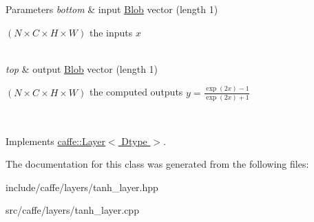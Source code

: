 \begin{DoxyParams}{Parameters}
{\em bottom} & input \hyperlink{classcaffe_1_1Blob}{Blob} vector (length 1)
\begin{DoxyEnumerate}
\item $ (N \times C \times H \times W) $ the inputs $ x $ 
\end{DoxyEnumerate}\\
\hline
{\em top} & output \hyperlink{classcaffe_1_1Blob}{Blob} vector (length 1)
\begin{DoxyEnumerate}
\item $ (N \times C \times H \times W) $ the computed outputs $ y = \frac{\exp(2x) - 1}{\exp(2x) + 1} $ 
\end{DoxyEnumerate}\\
\hline
\end{DoxyParams}


Implements \hyperlink{classcaffe_1_1Layer_add965883f75bbf90c7a06f960cda7a1a}{caffe\+::\+Layer$<$ Dtype $>$}.



The documentation for this class was generated from the following files\+:\begin{DoxyCompactItemize}
\item 
include/caffe/layers/tanh\+\_\+layer.\+hpp\item 
src/caffe/layers/tanh\+\_\+layer.\+cpp\end{DoxyCompactItemize}
